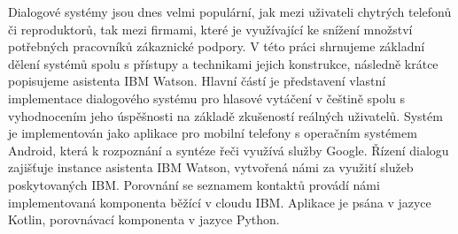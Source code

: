 \documentclass[12pt]{report}
\begin{document}

Dialogové systémy jsou dnes velmi populární, jak mezi uživateli chytrých
telefonů či reproduktorů, tak mezi firmami, které je využívající ke snížení
množství potřebných pracovníků zákaznické podpory. V této práci
shrnujeme základní dělení systémů spolu s přístupy a technikami
jejich konstrukce, následně krátce popisujeme asistenta IBM Watson.
Hlavní částí je představení vlastní implementace dialogového systému
pro hlasové vytáčení v češtině spolu s vyhodnocením jeho úspěšnosti
na základě zkušeností reálných uživatelů. Systém je implementován jako aplikace
pro mobilní telefony s operačním systémem Android, která k rozpoznání
a syntéze řeči využívá služby Google. Řízení dialogu zajišťuje instance asistenta
IBM Watson, vytvořená námi za využití služeb poskytovaných IBM.
Porovnání se seznamem kontaktů provádí námi implementovaná komponenta běžící
v cloudu IBM. Aplikace je psána v jazyce Kotlin, porovnávací komponenta
v jazyce Python.
\end{document}
